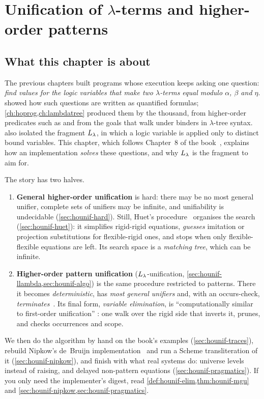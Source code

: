 \chapter{Unification of \texorpdfstring{$\lambda$}{λ}-terms and higher-order patterns}\label{ch:hounif}

\section{What this chapter is about}\label{sec:hounif-intro}

The previous chapters built programs whose execution keeps asking one question: \emph{find values for the
logic variables that make two $\lambda$-terms equal modulo $\alpha$, $\beta$ and $\eta$}.  showed
how such questions are written as quantified formulas; \cref{ch:hoprog,ch:lambdatree} produced them by the
thousand, from higher-order predicates such as  and from the  goals that walk under
binders in $\lambda$-tree syntax.  also isolated the fragment $L_\lambda$, in which a logic
variable is applied only to distinct bound variables. This chapter, which follows Chapter~8 of the
book~\cite{MillerNadathur2012}, explains how an implementation \emph{solves} these questions, and why $L_\lambda$ is
the fragment to aim for.

The story has two halves.
\begin{enumerate}[nosep]
  \item \textbf{General higher-order unification} is hard: there may be no most general unifier, complete sets
    of unifiers may be infinite, and unifiability is undecidable (\cref{sec:hounif-hard}). Still, Huet's
    procedure~\cite{Huet1975} organises the search (\cref{sec:hounif-huet}): it simplifies rigid-rigid
    equations, \emph{guesses} imitation or projection substitutions for flexible-rigid ones, and stops when only
    flexible-flexible equations are left. Its search space is a \emph{matching tree}, which can be infinite.
  \item \textbf{Higher-order pattern unification} ($L_\lambda$-unification, \cref{sec:hounif-llambda,sec:hounif-algo})
    is the same procedure restricted to patterns. There it becomes \emph{deterministic}, has \emph{most general
    unifiers} and, with an occurs-check, \emph{terminates}~\cite{Miller1991}. Its final form, \emph{variable
    elimination}, is \enquote{computationally similar to first-order unification} : one walk over the
    rigid side that inverts it, prunes, and checks occurrences and scope.
\end{enumerate}
We then do the algorithm by hand on the book's examples (\cref{sec:hounif-traces}), rebuild Nipkow's de~Bruijn
implementation~\cite{Nipkow1993} and run a Scheme transliteration of it (\cref{sec:hounif-nipkow}), and finish
with what real systems do: universe levels instead of raising, and delayed non-pattern equations
(\cref{sec:hounif-pragmatics}). If you only need the implementer's digest, read
\cref{def:hounif-elim,thm:hounif-mgu} and \cref{sec:hounif-nipkow,sec:hounif-pragmatics}.

